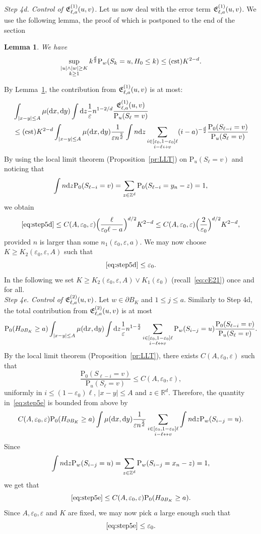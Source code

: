 \documentclass[a4paper,11pt]{amsart}
\numberwithin{equation}{section}
\newtheorem{lemma}[theorem]{Lemma}
\newcommand{\bbR}{{\ensuremath{\mathbb R}} }
\newcommand{\bbZ}{{\ensuremath{\mathbb Z}} }
\newcommand{\gep}{\varepsilon}
\newcommand{\dd}{\text{\rm d}}             %
\newcommand{\suptwo}[2]{\sup_{\substack{#1 \\ #2}}} %
\newcommand{\sumtwo}[2]{\sum_{\substack{#1 \\ #2}}} %
\newcommand\bP{\ensuremath{\mathrm{P}}}
\newcommand{\8}{\infty}
\newcommand{\beq}{\begin{equation}}
\newcommand{\eeq}{\end{equation}}
\newcommand{\ba}{\begin{aligned}}
\newcommand{\ea}{\end{aligned}}
\newcommand{\lra}{\leftrightarrow}
\begin{document}
{\it Step 4d. Control of ${\frak E}_{\ell,a}^{(1)}(u,v)$.} Let us now deal with the error term ${\frak E}_{\ell,a}^{(1)}(u,v)$. We use the following lemma, the proof of which is postponed to the end of the section
\begin{lemma}
\label{lem:return-origin}
We have
\beq
\suptwo{|u|\wedge|w|\ge K}{k\ge 1} k^{\frac d2}\bP_w(S_k = u, H_0 \le k) \le {\rm (cst)} K^{2-d}.
\eeq
\end{lemma}
By Lemma~\ref{lem:return-origin}, the contribution from ${\frak E}_{\ell,a}^{(1)}(u,v)$ is at most:
\beq
\label{eq:step5d}
\ba
&\int_{|x-y|\le A}  \mu(\dd x, \dd y) \int \dd z \frac 1\gep n^{1-2/d} \frac{{\frak E}_{\ell,a}^{(1)}(u,v)}{\bP_u(S_{\ell}=v)}\\
&\le {\rm (cst)} K^{2-d} \int_{|x-y|\le A} \mu(\dd x, \dd y) \frac{1}{\gep n^{\frac2d}} \int n \dd z  \sumtwo{i \in [\gep_0,1-\gep_0]\ell}{i-\ell\lra v} (i-a)^{-\frac d2}\frac{\bP_0(S_{\ell-i} = v)}{\bP_u(S_{\ell}=v)}
\ea
\eeq
By using the local limit theorem (Proposition~\ref{pr:LLT}) on $\bP_u(S_{\ell}=v)$ and noticing that 
\beq
\int n \dd z \bP_0(S_{\ell-i} = v) = \sum_{z\in\bbZ^d} \bP_0(S_{\ell-i} = y_n - z) = 1,
\eeq
we obtain
\beq
\eqref{eq:step5d} \le C(A,\gep_0,\gep)\Big(\frac{\ell}{\gep_0\ell - a}\Big)^{d/2} K^{2-d} \le C(A,\gep_0,\gep)\Big(\frac2 {\gep_0}\Big)^{d/2} K^{2-d},
\eeq
provided $n$ is larger than some $n_1(\gep_0,\gep, a)$. We may now choose $K\ge K_2(\gep_0,\gep,A)$ such that
\beq
\eqref{eq:step5d} \le \gep_0.
\eeq
In the following we set $K\ge K_2(\gep_0,\gep,A) \vee K_1(\gep_0)$ (recall~\eqref{eq:cE21}) once and for all.\\

{\it Step 4e. Control of ${\frak E}_{\ell,a}^{(2)}(u,v)$.} Let $w\in\partial B_K$ and $1\le j \le a$. Similarly to Step 4d, the total contribution from ${\frak E}_{\ell,a}^{(2)}(u,v)$ is at most
\beq
\label{eq:step5e}
\bP_0(H_{\partial B_K}\ge a) \int_{|x-y|\le A}\mu(\dd x,\dd y) \int \dd z \frac{1}{\gep} n^{1-\frac2d} \sumtwo{i \in [\gep_0,1-\gep_0]\ell}{i-\ell\lra v} \bP_w(S_{i-j}=u)\frac{\bP_0(S_{\ell-i}=v)}{\bP_u(S_\ell = v)}.
\eeq
By the local limit theorem (Proposition~\ref{pr:LLT}), there exists $C(A,\gep_0,\gep)$ such that
\beq
\frac{\bP_0(S_{\ell-i}=v)}{\bP_u(S_{\ell}=v)} \le C(A,\gep_0,\gep),
\eeq
uniformly in $i\le(1-\gep_0)\ell$, $|x-y|\le A$ and $z\in\bbR^d$. Therefore, the quantity in~\eqref{eq:step5e} is bounded from above by
\beq
C(A,\gep_0,\gep) \bP_0(H_{\partial B_K}\ge a) \int \mu(\dd x, \dd y)  \frac{1}{\gep n^{\frac2d}} \sumtwo{i \in [\gep_0,1-\gep_0]\ell}{i-\ell\lra v} \int n \dd z \bP_w(S_{i-j}=u).
\eeq
Since
\beq
\int n \dd z \bP_w(S_{i-j}=u) = \sum_{z\in\bbZ^d}\bP_w(S_{i-j}=x_n -z) = 1,
\eeq
we get that
\beq
\text{\eqref{eq:step5e}} \le C(A,\gep_0,\gep) \bP_0(H_{\partial B_K}\ge a).
\eeq
Since $A,\gep_0,\gep$ and $K$ are fixed, we may now pick $a$ large enough such that
\beq
\text{\eqref{eq:step5e}} \le \gep_0.
\eeq
\end{document}
